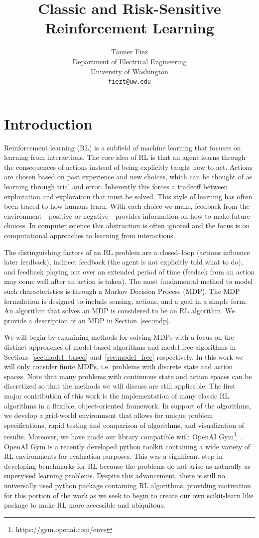 \documentclass{article}
\title{Classic and Risk-Sensitive Reinforcement Learning}
\author{
  Tanner Fiez \\
  Department of Electrical Engineering \\
  University of Washington \\
  \texttt{fiezt@uw.edu} \\
}
\begin{document}
\maketitle
\section{Introduction}
Reinforcement learning (RL) is a subfield of machine learning that focuses on learning from interactions. The core idea of RL is that an agent learns through the consequences of actions instead of being explicitly taught how to act. Actions are chosen based on past experience and new choices, which can be thought of as learning through trial and error. Inherently this forces a tradeoff between exploitation and exploration that must be solved. This style of learning has often been traced to how humans learn. With each choice we make, feedback from the environment---positive or negative---provides information on how to make future choices. In computer science this abstraction is often ignored and the focus is on computational approaches to learning from interactions. 

The distinguishing factors of an RL problem are a closed--loop (actions influence later feedback), indirect feedback (the agent is not explicitly told what to do), and feedback playing out over an extended period of time (feedack from an action may come well after an action is taken). The most fundamental method to model such characteristics is through a Markov Decision Process (MDP). The MDP formulation is designed to include sensing, actions, and a goal in a simple form. An algorithm that solves an MDP is considered to be an RL algorithm. We provide a description of an MDP in Section~\ref{sec:mdp}.

We will begin by examining methods for solving MDPs with a focus on the distinct approaches of model based algorithms and model free algorithms in Sections~\ref{sec:model_based} and~\ref{sec:model_free} respectively. In this work we will only consider finite MDPs, i.e. problems with discrete state and action spaces. Note that many problems with continuous state and action spaces can be discretized so that the methods we will discuss are still applicable. The first major contribution of this work is the implementation of many classic RL algorithms in a flexible, object-oriented framework. In support of the algorithms, we develop a grid-world environment that allows for unique problem specifications, rapid testing and comparison of algorithms, and visualization of results. Moreover, we have made our library compatible with OpenAI Gym\footnote{https://gym.openai.com/envs}~\cite{DBLP:journals/corr/BrockmanCPSSTZ16}. OpenAI Gym is a recently developed python toolkit containing a wide variety of RL environments for evaluation purposes. This was a significant step in developing benchmarks for RL because the problems do not arise as naturally as supervised learning problems. Despite this advancement, there is still no universally used python package containing RL algorithms, providing motivation for this portion of the work as we seek to begin to create our own scikit-learn like package to make RL more accessible and ubiquitous.
\end{document}
